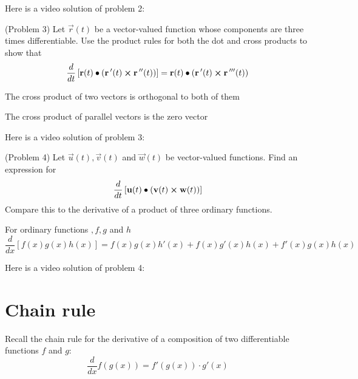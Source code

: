 \documentclass[handout]{ximera}
\begin{document}
Here is a video solution of problem 2:\\
\begin{foldable}
\end{foldable}

\begin{problem}(Problem 3)
Let $\vec r(t)$ be a vector-valued function whose components are three times differentiable. Use the product rules for both the dot and cross products to show that
\[
\frac{d}{dt}\left[\mathbf r(t) \bullet \left(\mathbf r\,'(t) \boldsymbol\times \mathbf r\,''(t)\right)\right] = \mathbf r(t) \bullet \left(\mathbf r\,'(t) \boldsymbol\times \mathbf r\,'''(t)\right)
\]
\begin{hint}
The cross product of two vectors is orthogonal to both of them
\end{hint}
\begin{hint}
The cross product of parallel vectors is the zero vector
\end{hint}
\end{problem}

Here is a video solution of problem 3:\\
\begin{foldable}
\end{foldable}

\begin{problem}(Problem 4)
Let $\vec u(t), \vec v(t)$ and $\vec w(t)$ be vector-valued functions. Find an expression for
\[
\frac{d}{dt}\left[ \mathbf u(t) \bullet \left(\mathbf v(t) \boldsymbol\times \mathbf w(t)\right)\right]
\]
Compare this to the derivative of a product of three ordinary functions.
\begin{hint}
For ordinary functions $,f, g$ and $h$
\[
\frac{d}{dx}\left[f(x)g(x)h(x)\right] = f(x)g(x)h'(x) + f(x)g'(x)h(x) + f'(x)g(x)h(x)
\]
\end{hint}
\end{problem}

Here is a video solution of problem 4:\\
\begin{foldable}
\end{foldable}

\section{Chain rule}
Recall the chain rule for the derivative of a composition of two differentiable functions $f$ and $g$:
\[
\frac{d}{dx} f(g(x)) = f'(g(x)) \cdot g'(x)
\]
\end{document}
